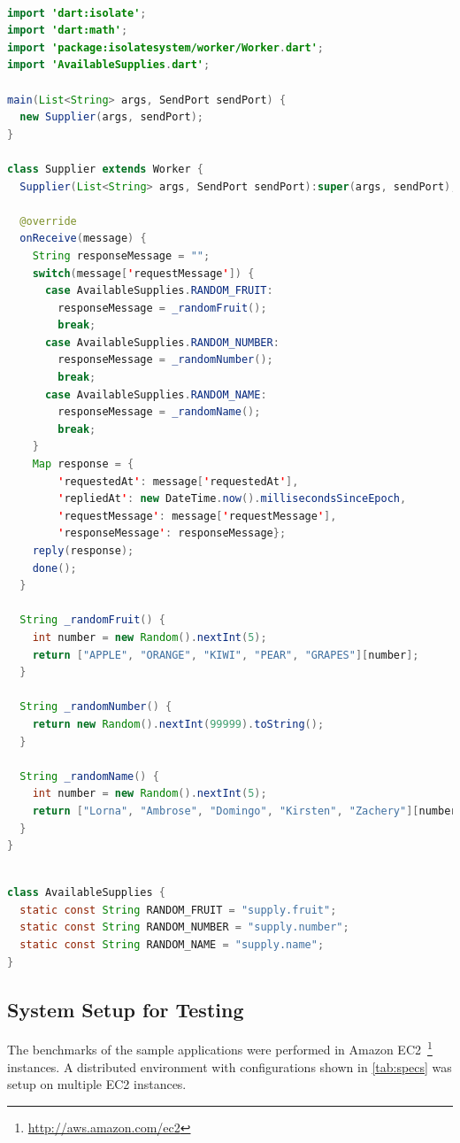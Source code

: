 \begin{lstlisting}[language=java, firstnumber=1, caption=Requester Worker of Requester-Supplier application, label=lst:supplier]

import 'dart:isolate';
import 'dart:math';
import 'package:isolatesystem/worker/Worker.dart';
import 'AvailableSupplies.dart';

main(List<String> args, SendPort sendPort) {
  new Supplier(args, sendPort);
}

class Supplier extends Worker {
  Supplier(List<String> args, SendPort sendPort):super(args, sendPort);

  @override
  onReceive(message) {
    String responseMessage = "";
    switch(message['requestMessage']) {
      case AvailableSupplies.RANDOM_FRUIT:
        responseMessage = _randomFruit();
        break;
      case AvailableSupplies.RANDOM_NUMBER:
        responseMessage = _randomNumber();
        break;
      case AvailableSupplies.RANDOM_NAME:
        responseMessage = _randomName();
        break;
    }
    Map response = {
        'requestedAt': message['requestedAt'],
        'repliedAt': new DateTime.now().millisecondsSinceEpoch,
        'requestMessage': message['requestMessage'],
        'responseMessage': responseMessage};
    reply(response);
    done();
  }

  String _randomFruit() {
    int number = new Random().nextInt(5);
    return ["APPLE", "ORANGE", "KIWI", "PEAR", "GRAPES"][number];
  }

  String _randomNumber() {
    return new Random().nextInt(99999).toString();
  }

  String _randomName() {
    int number = new Random().nextInt(5);
    return ["Lorna", "Ambrose", "Domingo", "Kirsten", "Zachery"][number];
  }
}

\end{lstlisting}

\begin{lstlisting}[language=java, firstnumber=1, caption=Supporting class that contains list of constants for pattern matching, label=lst:supportingClass]

class AvailableSupplies {
  static const String RANDOM_FRUIT = "supply.fruit";
  static const String RANDOM_NUMBER = "supply.number";
  static const String RANDOM_NAME = "supply.name";
}
\end{lstlisting}


\subsection{System Setup for Testing}
    The benchmarks of the sample applications were performed in Amazon EC2~\footnote{\url{http://aws.amazon.com/ec2}} instances. A distributed environment with configurations shown in \autoref{tab:specs} was setup on multiple EC2 instances.

